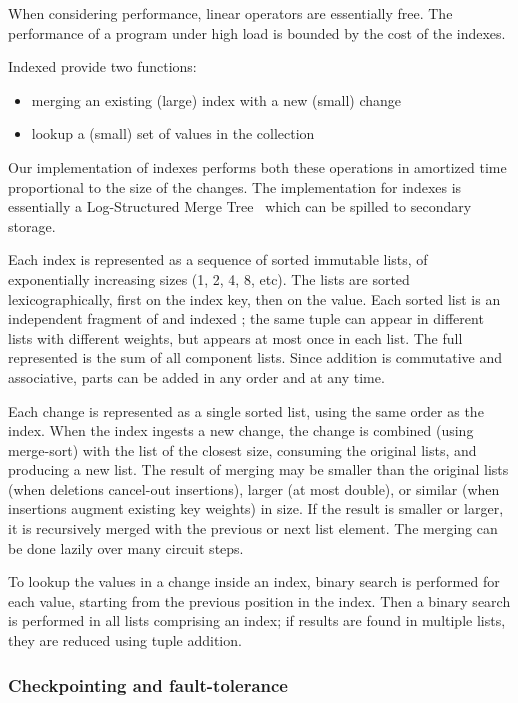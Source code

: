 When considering performance, linear operators are essentially free.
The performance of a \dbsp program under high load is bounded by the
cost of the indexes.

Indexed provide two functions:
\begin{itemize}
\item merging an existing (large) index with a new (small) change
\item lookup a (small) set of values in the collection
\end{itemize}

Our implementation of indexes performs both these operations in
amortized time proportional to the size of the changes.  The
implementation for indexes is essentially a Log-Structured Merge
Tree~\cite{oneil-ai96} which can be spilled to secondary storage.

Each index is represented as a sequence of sorted immutable lists, of
exponentially increasing sizes (1, 2, 4, 8, etc).  The lists are
sorted lexicographically, first on the index key, then on the value.
Each sorted list is an independent fragment of and indexed \zr; the
same tuple can appear in different lists with different weights, but
appears at most once in each list.  The full \zr represented is the
sum of all component lists.  Since addition is commutative and
associative, parts can be added in any order and at any time.

Each change is represented as a single sorted list, using the same
order as the index.  When the index ingests a new change, the change
is combined (using merge-sort) with the list of the closest size,
consuming the original lists, and producing a new list.  The result of
merging may be smaller than the original lists (when deletions
cancel-out insertions), larger (at most double), or similar (when
insertions augment existing key weights) in size.  If the result is
smaller or larger, it is recursively merged with the previous or next
list element.  The merging can be done lazily over many circuit steps.

To lookup the values in a change inside an index, binary search is
performed for each value, starting from the previous position in the
index.  Then a binary search is performed in all lists comprising an
index; if results are found in multiple lists, they are reduced using
tuple addition.

\subsubsection{Checkpointing and fault-tolerance}

